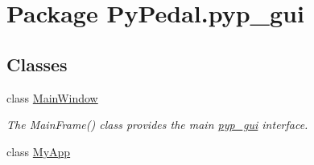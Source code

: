 \hypertarget{namespacePyPedal_1_1pyp__gui}{
\section{Package Py\-Pedal.pyp\_\-gui}
\label{namespacePyPedal_1_1pyp__gui}
}


\subsection*{Classes}
\begin{CompactItemize}
\item 
class \hyperlink{classPyPedal_1_1pyp__gui_1_1MainWindow}{Main\-Window}
\begin{CompactList}\small\item\em The Main\-Frame() class provides the main \hyperlink{namespacePyPedal_1_1pyp__gui}{pyp\_\-gui} interface. \item\end{CompactList}\item 
class \hyperlink{classPyPedal_1_1pyp__gui_1_1MyApp}{My\-App}
\end{CompactItemize}
